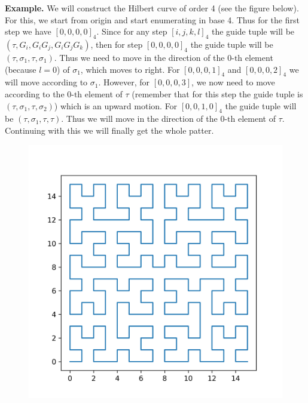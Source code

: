 \documentclass[12pt]{article}
\begin{document}
\noindent \textbf{Example.} We will construct the Hilbert curve of order 4 (see the figure below). For this, we start from origin and start enumerating in base 4. Thus for the first step we have $ [0,0,0,0]_4 $. Since for any step $ [i,j,k,l]_4 $ the guide tuple will be $ (\tau,G_i, G_i G_j, G_i G_j G_k ) $, then for step $ [0,0,0,0]_4 $ the guide tuple will be $ (\tau, \sigma_1, \tau, \sigma_1) $. Thus we need to move in the direction of the $ 0\text{-th} $ element (because $ l=0 $) of $ \sigma_1 $, which moves to right. For $ [0,0,0,1]_4 $ and $ [0,0,0,2]_4 $ we will move according to $ \sigma_1 $. However, for $ [0,0,0,3] $, we now need to move according to the $ 0\text{-th} $ element of $ \tau $ (remember that for this step the guide tuple is $ (\tau, \sigma_1,\tau,\sigma_2) $) which is an upward motion. For $ [0,0,1,0]_4 $ the guide tuple will be $ (\tau, \sigma_1, \tau, \tau) $. Thus we will move in the direction of the $ 0\text{-th} $ element of $ \tau $. Continuing with this we will finally get the whole patter.
\begin{figure}[h!]
	\centering
	\includegraphics[width=0.5\linewidth]{Images/iterative}
\end{figure}
\end{document}
